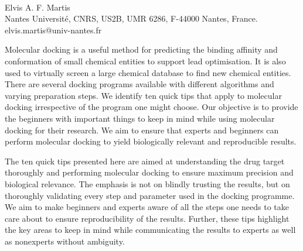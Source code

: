 \documentclass[10pt, a4paper]{book}
\begin{document}
{\Large
\textbf{}
}
\newline
\\
Elvis A. F. Martis
\\
\bigskip
Nantes Université, CNRS, US2B, UMR 6286, F-44000 Nantes, France.
\bigskip
elvis.martis@univ-nantes.fr


Molecular docking is a useful method for predicting the binding affinity and conformation of small chemical entities to support lead optimisation. It is also used to virtually screen a large chemical database to find new chemical entities. There are several docking programs available with different algorithms and varying preparation steps. We identify ten quick tips that apply to molecular docking irrespective of the program one might choose. Our objective is to provide the beginners with important things to keep in mind while using molecular docking for their research. We aim to ensure that experts and beginners can perform molecular docking to yield biologically relevant and reproducible results. 


The ten quick tips presented here are aimed at understanding the drug target thoroughly and performing molecular docking to ensure maximum precision and biological relevance. The emphasis is not on blindly trusting the results, but on thoroughly validating every step and parameter used in the docking programme. We aim to make beginners and experts aware of all the steps one needs to take care about to ensure reproducibility of the results. Further, these tips highlight the key areas to keep in mind while communicating the results to experts as well as nonexperts without ambiguity. 

\linenumbers
\end{document}
